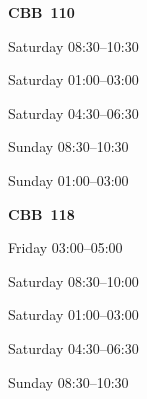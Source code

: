 \documentclass[11pt,oneside,letter]{article}
\begin{document}
\newpage


\begin{center}
{\LARGE {\bf CBB~110}}
\end{center}

\begin{center}
{\large Saturday 08:30--10:30}
\end{center}

\begin{center}
{\large Saturday 01:00--03:00}
\end{center}


\begin{center}
{\large Saturday 04:30--06:30}
\end{center}


\begin{center}
{\large Sunday 08:30--10:30}
\end{center}



\begin{center}
{\large Sunday 01:00--03:00}
\end{center}




\newpage




\begin{center}
{\LARGE {\bf CBB~118}}
\end{center}

\begin{center}
{\large Friday 03:00--05:00}
\end{center}


\begin{center}
{\large Saturday 08:30--10:00}
\end{center}


\begin{center}
{\large Saturday 01:00--03:00}
\end{center}


\begin{center}
{\large Saturday 04:30--06:30}
\end{center}


\begin{center}
{\large Sunday 08:30--10:30}
\end{center}

\end{document}
